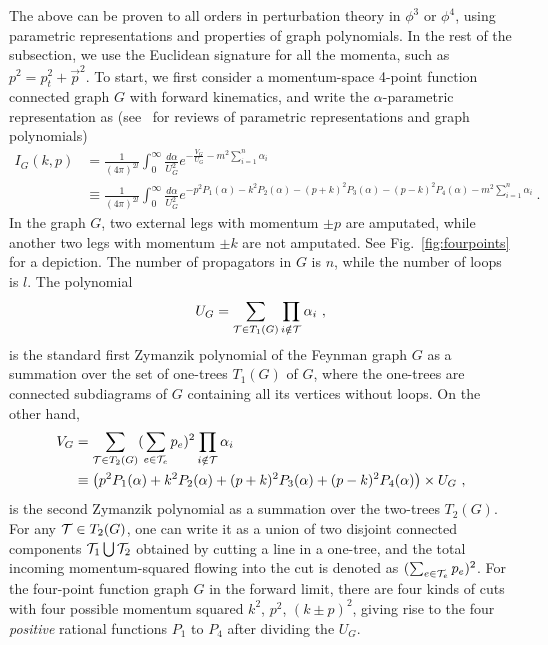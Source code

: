 \documentclass[a4paper,11pt]{article}
\begin{document}
The above can be proven to all orders in perturbation theory in $\phi^3$ or $\phi^4$, using parametric representations and properties of graph polynomials. In the rest of the subsection, we use the Euclidean signature for all the momenta, such as $p^2=p_t^2+\vec{p}^2$. To start, we first consider a momentum-space 4-point function connected graph $G$ with forward kinematics, and write the $\alpha$-parametric representation as (see~\cite{Krajewski:2008fa,Bogner:2010kv,Rivasseau:2014zpm} for reviews of parametric representations and graph polynomials)
\begin{align}
I_G(k,p)&=\frac{1}{(4\pi)^{2l}}\int_0^{\infty}\frac{d\alpha}{U_G^{2}}e^{-\frac{V_G}{U_G}-m^2\sum_{i=1}^n\alpha_i} \ \nonumber \\ 
&\equiv \frac{1}{(4\pi)^{2l}}\int_0^{\infty}\frac{d\alpha}{U_G^2}e^{-p^2P_1(\alpha)-k^2P_2(\alpha)-(p+k)^2P_3(\alpha)-(p-k)^2P_4(\alpha)-m^2\sum_{i=1}^n\alpha_i} \ .
\end{align}
In the graph $G$, two external legs with momentum $\pm p$ are amputated, while another two legs with momentum $\pm k$ are not amputated. See Fig.~\ref{fig:fourpoints} for a depiction. The number of propagators in $G$ is $n$, while the number of loops is $l$. The polynomial
\begin{align}\label{eq:U_G}
U_G=\sum_{{\cal T} \in T_1(G)}\prod_{i\notin {\cal T}}\alpha_i \ ,
\end{align}
is the standard first Zymanzik polynomial of the Feynman graph $G$ as a summation over the set of one-trees $T_1(G)$ of $G$, where the one-trees are connected subdiagrams of $G$ containing all its vertices without loops. On the other hand, 
\begin{align}\label{eq:V_G}
V_G&=\sum_{{\cal T}  \in T_2(G)} (\sum_{e\in {\cal T}_e} p_e)^2\prod_{i\notin {\cal T}}\alpha_i\nonumber \\ 
&\equiv \left(p^2P_1(\alpha)+k^2P_2(\alpha)+(p+k)^2P_3(\alpha)+(p-k)^2P_4(\alpha) \right)\times U_G \ , 
\end{align}
is the second Zymanzik polynomial as a summation over the two-trees $T_2(G)$. For any ${\cal T} \in T_2(G)$, one can write it as a union of two disjoint connected components ${\cal T}_1 \bigcup {\cal T}_2$ obtained by cutting a line in a one-tree, and the total incoming momentum-squared flowing into the cut is denoted as $(\sum_{e\in {\cal T}_e} p_e)^2$. For the four-point function graph $G$ in the forward limit, there are four kinds of cuts with four possible momentum squared $k^2$, $p^2$, $(k\pm p)^2$, giving rise to the four {\it positive} rational functions $P_1$ to $P_4$ after dividing the $U_G$. 
\end{document}
